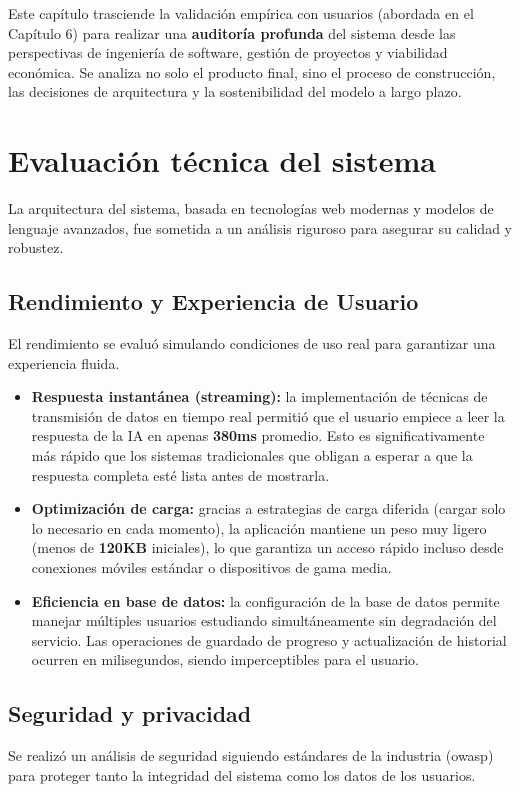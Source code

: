 Este capítulo trasciende la validación empírica con usuarios (abordada en el Capítulo 6) para realizar una \textbf{auditoría profunda} del sistema desde las perspectivas de ingeniería de software, gestión de proyectos y viabilidad económica. Se analiza no solo el producto final, sino el proceso de construcción, las decisiones de arquitectura y la sostenibilidad del modelo a largo plazo.

\section{Evaluación técnica del sistema}

La arquitectura del sistema, basada en tecnologías web modernas y modelos de lenguaje avanzados, fue sometida a un análisis riguroso para asegurar su calidad y robustez.

\subsection{Rendimiento y Experiencia de Usuario}
El rendimiento se evaluó simulando condiciones de uso real para garantizar una experiencia fluida.

\begin{itemize}
\item   \textbf{Respuesta instantánea (streaming):} la implementación de técnicas de transmisión de datos en tiempo real permitió que el usuario empiece a leer la respuesta de la IA en apenas \textbf{380ms} promedio. Esto es significativamente más rápido que los sistemas tradicionales que obligan a esperar a que la respuesta completa esté lista antes de mostrarla.
\item   \textbf{Optimización de carga:} gracias a estrategias de carga diferida (cargar solo lo necesario en cada momento), la aplicación mantiene un peso muy ligero (menos de \textbf{120KB} iniciales), lo que garantiza un acceso rápido incluso desde conexiones móviles estándar o dispositivos de gama media.
\item   \textbf{Eficiencia en base de datos:} la configuración de la base de datos permite manejar múltiples usuarios estudiando simultáneamente sin degradación del servicio. Las operaciones de guardado de progreso y actualización de historial ocurren en milisegundos, siendo imperceptibles para el usuario.
\end{itemize}

\subsection{Seguridad y privacidad}
Se realizó un análisis de seguridad siguiendo estándares de la industria (\gls{owasp}) para proteger tanto la integridad del sistema como los datos de los usuarios.

